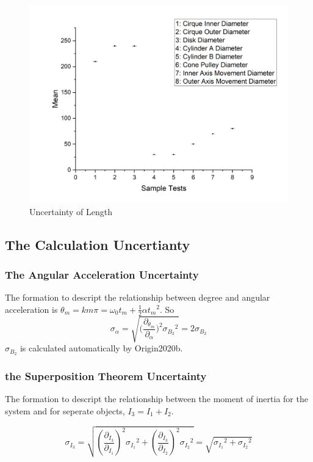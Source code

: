 \documentclass[12pt,a4paper]{article}
\begin{document}
\begin{figure}[h]
    \centering
    \includegraphics[width=13cm]{uncertainty.png}
    \caption{Uncertainty of Length}
\end{figure}



\subsection{The Calculation Uncertianty}
\subsubsection{The Angular Acceleration Uncertainty}
The formation to descript the relationship between degree and angular acceleration is $\theta_m=km\pi=\omega_0t_m+\frac{1}{2}\alpha{t_m}^2$. So $$\sigma_\alpha=\sqrt{{(\frac{\partial_{\theta_m}}{\partial_\alpha}})^2{\sigma_{B_2}}^2}=2\sigma_{B_2}$$ $\sigma_{B_2}$ is calculated automatically by Origin2020b.

\subsubsection{the Superposition Theorem Uncertainty}
The formation to descript the relationship between the moment of inertia for the system and for seperate objects, $I_3=I_1+I_2$.

$$\sigma_{I_3}=\sqrt{(\frac{\partial_{I_3}}{\partial_{I_1}})^2{\sigma_{I_1}}^2+(\frac{\partial_{I_3}}{\partial_{I_2}})^2{\sigma_{I_2}}^2}=\sqrt{{\sigma_{I_1}}^2+{\sigma_{I_2}}^2}$$
\end{document}
